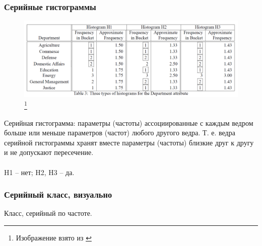 \documentclass{beamer}
\begin{document}
\begin{frame}
\frametitle{Серийные гистограммы}

\begin{figure}[htb]
\includegraphics[width=\textwidth,height=0.79\textheight,keepaspectratio]{histogram-example-ioannidis-2.png} 
\footnote{\tiny{Изображение взято из \cite{Ioannidis1995}}}
\end{figure}
{\scriptsize
Серийная гистограмма: параметры (частоты) ассоциированные с каждым ведром больше или меньше параметров (частот) любого другого ведра. Т. е. ведра серийной гистограммы хранят вместе параметры (частоты)  близкие друг к другу и не допускают пересечение. \\~\\

H1 -- нет; H2, H3 -- да.
}
\end{frame}



\begin{frame}
\frametitle{Серийный класс, визуально}
\center
{}
\raggedright
Класс, серийный по частоте.

\end{frame}
\end{document}
